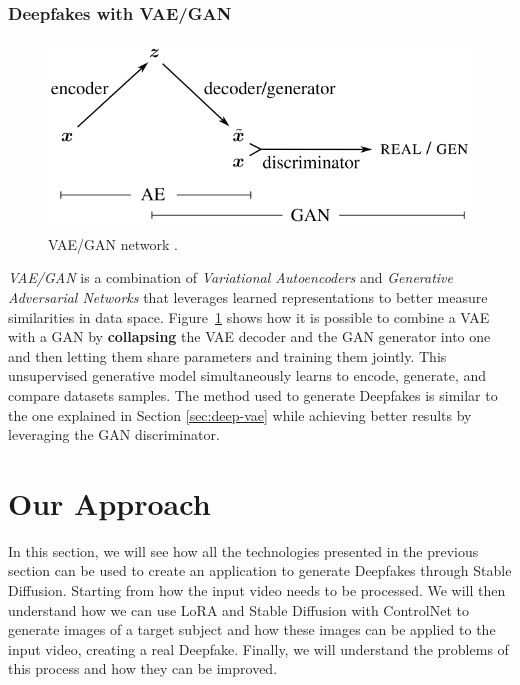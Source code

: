 \documentclass[preprint]{elsarticle}
\begin{document}
\subsubsection{Deepfakes with VAE/GAN}
\begin{figure}[H]
	\centering
	\includegraphics[scale=0.35]{img/background_img/vae-gan.png}
	\caption{VAE/GAN network \cite{larsen2016autoencoding}.}
	\label{fig:vae-gan}
\end{figure}

\emph{VAE/GAN} \cite{larsen2016autoencoding} is a combination of \emph{Variational Autoencoders} and \emph{Generative Adversarial Networks}
that leverages learned representations to better measure similarities in data space.
Figure~\ref{fig:vae-gan} shows how it is possible to combine a VAE with a GAN by \textbf{collapsing} the VAE decoder and the GAN generator 
into one and then letting them share parameters and training them jointly. 
This unsupervised generative model simultaneously learns to encode, generate, and compare datasets samples. 
The method used to generate Deepfakes is similar to the one explained in Section \ref{sec:deep-vae} while achieving 
better results by leveraging the GAN discriminator.



















\section{Our Approach} \label{ch:project}
In this section, we will see how all the technologies presented in the previous 
section can be used to create an application to generate Deepfakes through Stable Diffusion. 
Starting from how the input video needs to be processed. 
We will then understand how we can use LoRA and Stable Diffusion with ControlNet to 
generate images of a target subject and how these images can be applied to the input video, 
creating a real Deepfake. 
Finally, we will understand the problems of this process and how they can be improved.
\end{document}
